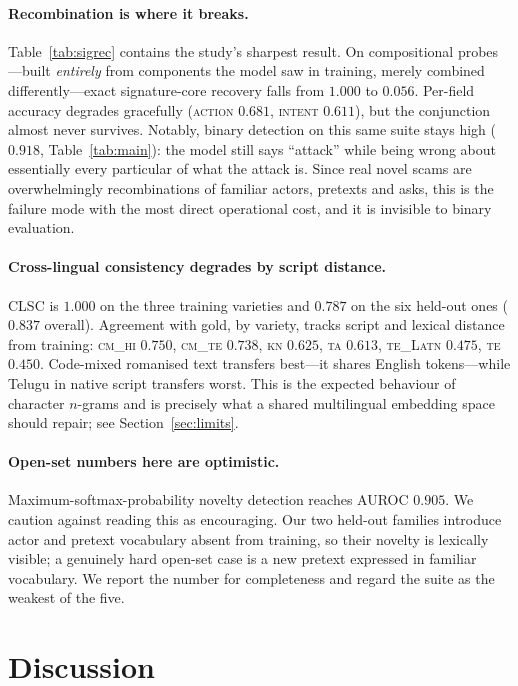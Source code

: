 \documentclass[11pt,a4paper]{article}
\begin{document}
\paragraph{Recombination is where it breaks.}
Table~\ref{tab:sigrec} contains the study's sharpest result. On compositional
probes---built \emph{entirely} from components the model saw in training, merely
combined differently---exact signature-core recovery falls from $1.000$ to
$\mathbf{0.056}$. Per-field accuracy degrades gracefully (\textsc{action}
$0.681$, \textsc{intent} $0.611$), but the conjunction almost never survives.
Notably, binary detection on this same suite stays high ($0.918$,
Table~\ref{tab:main}): the model still says ``attack'' while being wrong about
essentially every particular of what the attack is. Since real novel scams are
overwhelmingly recombinations of familiar actors, pretexts and asks, this is the
failure mode with the most direct operational cost, and it is invisible to
binary evaluation.

\paragraph{Cross-lingual consistency degrades by script distance.}
CLSC is $1.000$ on the three training varieties and $0.787$ on the six held-out
ones ($0.837$ overall). Agreement with gold, by variety, tracks script and
lexical distance from training: \textsc{cm\_hi} $0.750$, \textsc{cm\_te} $0.738$,
\textsc{kn} $0.625$, \textsc{ta} $0.613$, \textsc{te\_Latn} $0.475$,
\textsc{te} $0.450$. Code-mixed romanised text transfers best---it shares
English tokens---while Telugu in native script transfers worst. This is the
expected behaviour of character $n$-grams and is precisely what a shared
multilingual embedding space should repair; see Section~\ref{sec:limits}.

\paragraph{Open-set numbers here are optimistic.}
Maximum-softmax-probability novelty detection reaches AUROC $0.905$. We caution
against reading this as encouraging. Our two held-out families introduce actor
and pretext vocabulary absent from training, so their novelty is lexically
visible; a genuinely hard open-set case is a new pretext expressed in familiar
vocabulary. We report the number for completeness and regard the suite as the
weakest of the five.

\section{Discussion}
\end{document}
